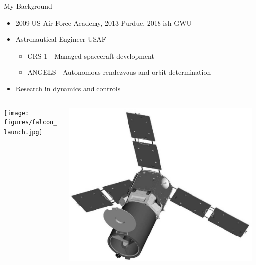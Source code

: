 \documentclass[11pt,professionalfonts]{beamer}
\begin{document}
\begin{frame}{My Background}
    \begin{itemize}
        \item 2009 US Air Force Academy, 2013 Purdue, 2018-ish GWU
        \item Astronautical Engineer USAF 
            \begin{itemize}
                \item ORS-1 - Managed spacecraft development
                \item ANGELS - Autonomous rendezvous and orbit determination
            \end{itemize}
        \item Research in dynamics and controls
    \end{itemize}
    \begin{columns}
        \begin{column}{0.5\textwidth}
            \texttt{[image: figures/falcon\_launch.jpg]}~
        \end{column}
        \begin{column}{0.5\textwidth}
            \centering
            \includegraphics[width=\textwidth, height=0.3\textheight, keepaspectratio]{figures/ORS-1_graphic.jpg}


\end{column}
\end{columns}
\end{frame}
\end{document}
